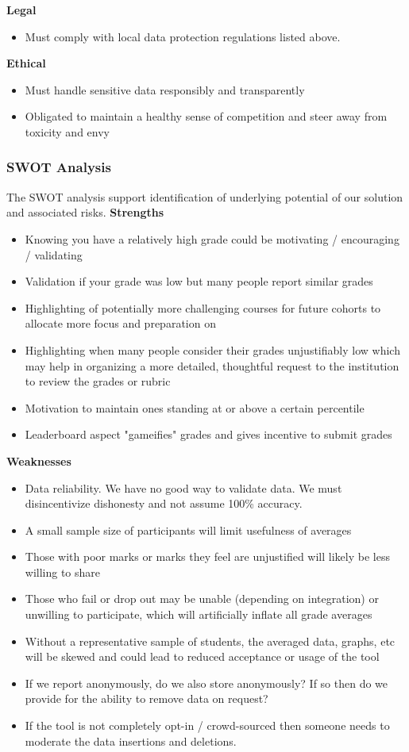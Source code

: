 \textbf{Legal}
\begin{itemize}
    \item Must comply with local data protection regulations listed above.
\end{itemize}
\textbf{Ethical}
\begin{itemize}
    \item Must handle sensitive data responsibly and transparently
    \item Obligated to maintain a healthy sense of competition and steer away from toxicity and envy
\end{itemize}
\bigskip

\noindent \subsubsection{SWOT Analysis}
The SWOT analysis support identification of underlying potential of our solution and associated risks.
\textbf{Strengths}
\begin{itemize}
    \item Knowing you have a relatively high grade could be motivating / encouraging / validating
    \item Validation if your grade was low but many people report similar grades
    \item Highlighting of potentially more challenging courses for future cohorts to allocate more focus and preparation on
    \item Highlighting when many people consider their grades unjustifiably low which may help in organizing a more detailed, thoughtful request to the institution to review the grades or rubric
    \item Motivation to maintain ones standing at or above a certain percentile
    \item Leaderboard aspect "gameifies" grades and gives incentive to submit grades
\end{itemize}
\textbf{Weaknesses}
\begin{itemize}
    \item Data reliability. We have no good way to validate data. We must disincentivize dishonesty and not assume 100\% accuracy.
    \item A small sample size of participants will limit usefulness of averages
    \item Those with poor marks or marks they feel are unjustified will likely be less willing to share
    \item Those who fail or drop out may be unable (depending on integration) or unwilling to participate, which will artificially inflate all grade averages
    \item Without a   representative sample of students, the averaged data, graphs, etc will be skewed and could lead to reduced acceptance or usage of the tool
    \item If we report anonymously, do we also store anonymously? If so then do we provide for the ability to remove data on request?
    \item If the tool is not completely opt-in / crowd-sourced then someone needs to moderate the data insertions and deletions.
\end{itemize}
